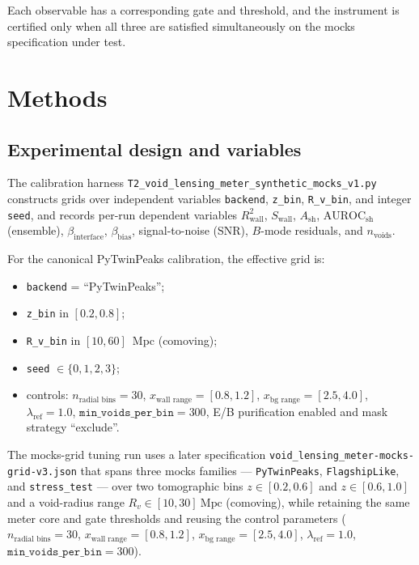 \documentclass{article}
\begin{document}
Each observable has a corresponding gate and threshold, and the
instrument is certified only when all three are satisfied
simultaneously on the mocks specification under test.

\section{Methods}
\subsection*{Experimental design and variables}
The calibration harness
\texttt{T2\_void\_lensing\_meter\_synthetic\_mocks\_v1.py}
constructs grids over independent variables
\texttt{backend}, \texttt{z\_bin}, \texttt{R\_v\_bin}, and
integer \texttt{seed}, and records per-run dependent variables
$R^2_{\text{wall}}$, $S_{\text{wall}}$, $A_{\text{sh}}$,
$\mathrm{AUROC}_{\text{sh}}$ (ensemble), $\beta_{\text{interface}}$,
$\beta_{\text{bias}}$, signal-to-noise (SNR), $B$-mode residuals, and
$n_{\text{voids}}$.

For the canonical PyTwinPeaks calibration,
the effective grid is:
\begin{itemize}
  \item \texttt{backend} = ``PyTwinPeaks'';
  \item \texttt{z\_bin} in $[0.2, 0.8]$;
  \item \texttt{R\_v\_bin} in $[10, 60]$~Mpc (comoving);
  \item \texttt{seed} $\in \{0,1,2,3\}$;
  \item controls:
    $n_{\text{radial bins}} = 30$,
    $x_{\text{wall range}} = [0.8, 1.2]$,
    $x_{\text{bg range}} = [2.5, 4.0]$,
    $\lambda_{\text{ref}} = 1.0$,
    $\texttt{min\_voids\_per\_bin} = 300$,
    E/B purification enabled and mask strategy ``exclude''.
\end{itemize}

The mocks-grid tuning run uses a later specification
\texttt{void\_lensing\_meter-mocks-grid-v3.json} that spans three mocks
families --- \texttt{PyTwinPeaks}, \texttt{FlagshipLike}, and
\texttt{stress\_test} --- over two tomographic bins
$z\in[0.2,0.6]$ and $z\in[0.6,1.0]$ and a void-radius range
$R_v\in[10,30]~\mathrm{Mpc}$ (comoving), while retaining the
same meter core and gate thresholds and reusing the control parameters
($n_{\text{radial bins}} = 30$,
$x_{\text{wall range}} = [0.8, 1.2]$,
$x_{\text{bg range}} = [2.5, 4.0]$,
$\lambda_{\text{ref}} = 1.0$,
$\texttt{min\_voids\_per\_bin} = 300$).
\end{document}
